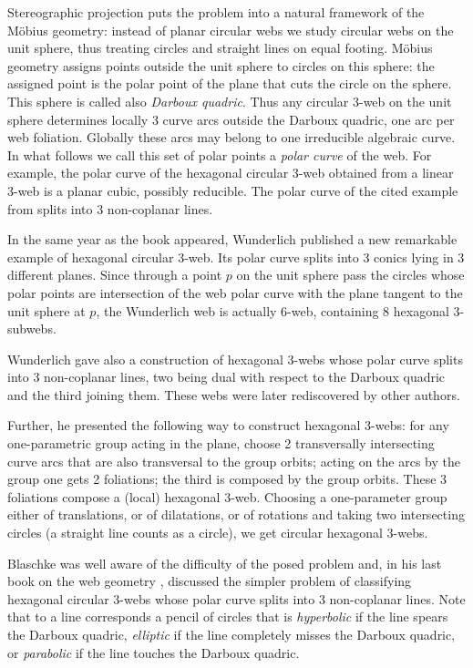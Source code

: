 \documentclass[pdftex]{sigma}
\numberwithin{equation}{section}
\begin{document}
Stereographic projection puts the problem into a natural framework of the M\"obius geometry: instead of planar circular webs we study circular webs on the unit sphere, thus treating circles and straight lines on equal footing. M\"obius geometry assigns points outside the unit sphere to circles on this sphere: the assigned point is the polar point of the plane that cuts the circle on the sphere. This sphere is called also {\it Darboux quadric}. Thus any circular 3-web on the unit sphere determines locally 3 curve arcs outside the Darboux quadric, one arc per web foliation. Globally these arcs may belong to one irreducible algebraic curve. In what follows we call this set of polar points a {\it polar curve} of the web. For example, the polar curve of the hexagonal circular 3-web obtained from a linear 3-web is a planar cubic, possibly reducible. The polar curve of the cited example from \cite{BB-38} splits into 3 non-coplanar lines.

In the same year as the book \cite{BB-38} appeared, Wunderlich published a new remarkable example of hexagonal circular 3-web. Its polar curve splits into 3 conics lying in 3 different planes. Since through a point $p$ on the unit sphere pass the circles whose polar points are intersection of the web polar curve with the plane tangent to the unit sphere at $p$, the Wunderlich web is actually 6-web, containing 8 hexagonal 3-subwebs.

Wunderlich gave also a construction of hexagonal 3-webs whose polar curve splits into 3 non-coplanar lines, two being dual with respect to the Darboux quadric and the third joining them. These webs were later rediscovered by other authors.

Further, he presented the following way to construct hexagonal 3-webs: for any one-para\-met\-ric group acting in the plane, choose 2 transversally intersecting curve arcs that are also transversal to the group orbits; acting on the arcs by the group one gets 2 foliations; the third is composed by the group orbits. These 3 foliations compose a (local) hexagonal 3-web. Choosing a one-parameter group either of translations, or of dilatations, or of rotations and taking two intersecting circles (a straight line counts as a circle), we get circular hexagonal 3-webs.

 Blaschke was well aware of the difficulty of the posed problem and, in his last book on the web geometry \cite{B-55}, discussed the simpler problem of classifying hexagonal circular 3-webs whose polar curve splits into 3 non-coplanar lines. Note that to a line corresponds a pencil of circles that is {\it hyperbolic} if the line spears the Darboux quadric, {\it elliptic} if the line completely misses the Darboux quadric, or {\it parabolic} if the line touches the Darboux quadric.
\end{document}

